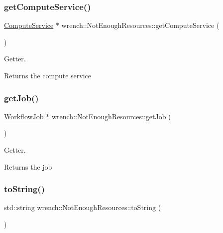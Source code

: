 \subsubsection{\texorpdfstring{get\+Compute\+Service()}{getComputeService()}}
{\footnotesize\ttfamily \hyperlink{classwrench_1_1_compute_service}{Compute\+Service} $\ast$ wrench\+::\+Not\+Enough\+Resources\+::get\+Compute\+Service (\begin{DoxyParamCaption}{ }\end{DoxyParamCaption})}



Getter. 

\begin{DoxyReturn}{Returns}
the compute service 
\end{DoxyReturn}
\mbox{\label{classwrench_1_1_not_enough_resources_a8bf50edc9be82619b404ae82a9288f94}} 
\subsubsection{\texorpdfstring{get\+Job()}{getJob()}}
{\footnotesize\ttfamily \hyperlink{classwrench_1_1_workflow_job}{Workflow\+Job} $\ast$ wrench\+::\+Not\+Enough\+Resources\+::get\+Job (\begin{DoxyParamCaption}{ }\end{DoxyParamCaption})}



Getter. 

\begin{DoxyReturn}{Returns}
the job 
\end{DoxyReturn}
\mbox{\label{classwrench_1_1_not_enough_resources_aeccad36aeccb259ac4c2d17752963269}} 
\subsubsection{\texorpdfstring{to\+String()}{toString()}}
{\footnotesize\ttfamily std\+::string wrench\+::\+Not\+Enough\+Resources\+::to\+String (\begin{DoxyParamCaption}{ }\end{DoxyParamCaption})\hspace{0.3cm}{\ttfamily [virtual]}}



